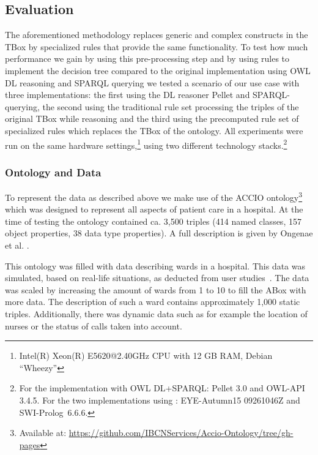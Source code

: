 \subsection{Evaluation}\label{ev}
The aforementioned methodology replaces generic and complex constructs in the TBox
by specialized rules that provide the same functionality.
To test how much performance we gain by using this pre-processing step 
and by using rules to implement the decision tree compared to the original implementation using OWL DL reasoning and SPARQL querying
we tested a scenario of our use case with three implementations: the first using the DL reasoner Pellet \cite{Pellet} and SPARQL-querying, 
the second using the traditional rule set processing the triples of the original TBox while reasoning %
and the third using the precomputed rule set of specialized rules which replaces the TBox of the ontology. %
All experiments were run on the same hardware settings,\footnote{Intel(R) Xeon(R) E5620@2.40GHz CPU with 12 GB RAM, Debian ``Wheezy''} using two different 
technology stacks.\footnote{
For the implementation with OWL DL+SPARQL: Pellet 3.0 and OWL-API 3.4.5. For the two implementations using \nthree: EYE-Autumn15 09261046Z and SWI-Prolog~6.6.6.}


\subsubsection{Ontology and Data}\label{ont}
To represent the data as described above we make use of the ACCIO ontology\footnote{Available at: \url{https://github.com/IBCNServices/Accio-Ontology/tree/gh-pages}} which was designed to represent all aspects of patient care in a hospital. 
At the time of testing the ontology contained ca. 
3,500 triples (414 named classes, 157 object properties,  38 data type properties).
A full description is given by Ongenae et al. \cite{accioont}. 

This ontology was filled with data describing wards in a hospital.
This data was simulated, based on real-life situations, as deducted from user studies~\cite{accioontold}.
The data was scaled by increasing the amount of wards from 1 to 10 to fill the ABox with more data. The description of such a ward contains
approximately 1,000 static triples. Additionally, there was dynamic data such as for example the location of nurses or the status of calls taken into account.

